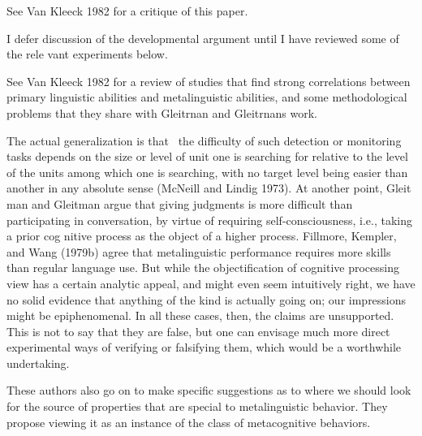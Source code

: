 \setcounter{listWWNumxlvleveli}{26}
\begin{listWWNumxlvleveli}
\item 
\begin{styleStandard}
See Van Kleeck 1982 for a critique of this paper.
\end{styleStandard}


\item 
\begin{styleStandard}
I defer discussion of the developmental argument until I have reviewed some of the rele\- vant experiments below.
\end{styleStandard}


\item 
\begin{styleStandard}
See Van Kleeck 1982 for a review of studies that find strong correlations between primary linguistic abilities and metalinguistic abilities, and some methodological problems that they share with Gleitrnan and Gleitrnan{\textquotesingle}s work.
\end{styleStandard}


\end{listWWNumxlvleveli}
\clearpage\setcounter{page}{1}\begin{styleStandard}
The actual generalization is that \ the difficulty of such detection or monitoring tasks depends on the size or level of unit one is searching for relative to the level of the units among which one is searching, with no target level being easier than another in any absolute sense (McNeill and Lindig 1973). At another point, Gleit\- man and Gleitman argue that giving judgments is more difficult than participating in conversation, by virtue of requiring self-consciousness, i.e., taking a prior cog\- nitive process as the object of a higher process. Fillmore, Kempler, and Wang (1979b) agree that metalinguistic performance requires more skills than regular language use. But while the {\textquotedbl}objectification of cognitive processing{\textquotedbl} view has a certain analytic appeal, and might even seem intuitively right, we have no solid evidence that anything of the kind is actually going on; our impressions might be epiphenomenal. In all these cases, then, the claims are unsupported. This is not to say that they are false, but one can envisage much more direct experimental ways of verifying or falsifying them, which would be a worthwhile undertaking.
\end{styleStandard}


\begin{styleStandard}
These authors also go on to make specific suggestions as to where we should look for the source of properties that are special to metalinguistic behavior. They propose viewing it as an instance of the class of metacognitive behaviors.
\end{styleStandard}


